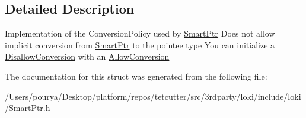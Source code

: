 \subsection{Detailed Description}
Implementation of the Conversion\+Policy used by \hyperlink{classLoki_1_1SmartPtr}{Smart\+Ptr} Does not allow implicit conversion from \hyperlink{classLoki_1_1SmartPtr}{Smart\+Ptr} to the pointee type You can initialize a \hyperlink{structLoki_1_1DisallowConversion}{Disallow\+Conversion} with an \hyperlink{structLoki_1_1AllowConversion}{Allow\+Conversion} 

The documentation for this struct was generated from the following file\+:\begin{DoxyCompactItemize}
\item 
/\+Users/pourya/\+Desktop/platform/repos/tetcutter/src/3rdparty/loki/include/loki/Smart\+Ptr.\+h\end{DoxyCompactItemize}
